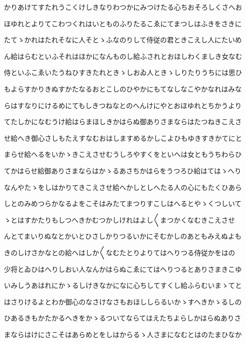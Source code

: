 \documentclass[a4paper,11pt,landscape]{ltjtarticle}
\begin{document}
\par\medskip
かりあけてすたれうこくけしきなりわつかにみつけたる心ちおそろしくさへお
\par\medskip
ほゆれとよりてこわつくれはいとものふりたるこゑにてまつしはふきをさきに
\par\medskip
たてゝかれはたれそなに人そとゝふなのりして侍従の君ときこえし人にたいめ
\par\medskip
ん給はらむといふそれはほかになんものし給ふされとおほしわくましき女なむ
\par\medskip
侍といふこゑいたうねひすきたれときゝしおゐ人ときゝしりたりうちには思ひ
\par\medskip
もよらすかりきぬすかたなるおとこしのひやかにもてなしなこやかなれはみな
\par\medskip
らはすなりにけるめにてもしきつねなとのへんけにやとおほゆれとちかうより
\par\medskip
てたしかになむうけ給はらまほしきかはらぬ御ありさまならはたつねきこえさ
\par\medskip
せ給へき御心さしもたえすなむおはしますめるかしこよひもゆきすきかてにと
\par\medskip
まらせ給へるをいかゝきこえさせむうしろやすくをといへは女ともうちわらひ
\par\medskip
てかはらせ給御ありさまならはかゝるあさちかはらをうつろひ給はてはゝへり
\par\medskip
なんやたゝをしはかりてきこえさせ給へかしとしへたる人の心にもたくひあら
\par\medskip
しとのみめつらかなるよをこそはみたてまつりすこしはへるとやゝくつしいて
\par\medskip
ゝとはすかたりもしつへきかむつかしけれはよし〱まつかくなむきこえさせ
\par\medskip
んとてまいりぬなとかいとひさしかりつるいかにそむかしのあともみえぬよも
\par\medskip
きのしけさかなとの給へはしか〱なむたとりよりてはへりつる侍従かをはの
\par\medskip
少将とゐひはへりしおい人なんかはらぬこゑにてはへりつるとありさまきこゆ
\par\medskip
いみしうあはれにかゝるしけきなかになに心ちしてすくし給ふらむいまゝてと
\par\medskip
はさりけるよとわか御心のなさけなさもおほししらるいかゝすへきかゝるしの
\par\medskip
ひあるきもかたかるへきをかゝるついてならてはえたちよらしかはらぬありさ
\par\medskip
まならはけにさこそはあらめとをしはからるゝ人さまになむとはのたまひなか
\end{document}
